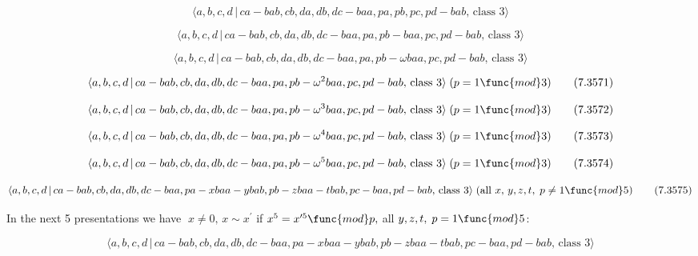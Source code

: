 \documentclass[10pt]{article}
\begin{document}
\begin{equation}
\langle a,b,c,d\,|\,ca-bab,cb,da,db,dc-baa,pa,pb,pc,pd-bab,\,\text{class }%
3\rangle  \tag{7.3568}
\end{equation}

\begin{equation}
\langle a,b,c,d\,|\,ca-bab,cb,da,db,dc-baa,pa,pb-baa,pc,pd-bab,\,\text{class 
}3\rangle  \tag{7.3569}
\end{equation}

\begin{equation}
\langle a,b,c,d\,|\,ca-bab,cb,da,db,dc-baa,pa,pb-\omega baa,pc,pd-bab,\,%
\text{class }3\rangle  \tag{7.3570}
\end{equation}

\begin{equation}
\langle a,b,c,d\,|\,ca-bab,cb,da,db,dc-baa,pa,pb-\omega ^{2}baa,pc,pd-bab,\,%
\text{class }3\rangle \;(p=1\func{mod}3)  \tag{7.3571}
\end{equation}

\begin{equation}
\langle a,b,c,d\,|\,ca-bab,cb,da,db,dc-baa,pa,pb-\omega ^{3}baa,pc,pd-bab,\,%
\text{class }3\rangle \;(p=1\func{mod}3)  \tag{7.3572}
\end{equation}

\begin{equation}
\langle a,b,c,d\,|\,ca-bab,cb,da,db,dc-baa,pa,pb-\omega ^{4}baa,pc,pd-bab,\,%
\text{class }3\rangle \;(p=1\func{mod}3)  \tag{7.3573}
\end{equation}

\begin{equation}
\langle a,b,c,d\,|\,ca-bab,cb,da,db,dc-baa,pa,pb-\omega ^{5}baa,pc,pd-bab,\,%
\text{class }3\rangle \;(p=1\func{mod}3)  \tag{7.3574}
\end{equation}

\begin{equation}
\langle
a,b,c,d\,|\,ca-bab,cb,da,db,dc-baa,pa-xbaa-ybab,pb-zbaa-tbab,pc-baa,pd-bab,\,%
\text{class }3\rangle \;(\text{all }x,\,y,z,t,\;p\neq 1\func{mod}5) 
\tag{7.3575}
\end{equation}

In the next 5 presentations we have $\;x\neq 0,\,x\sim x^{\prime }$ if $%
x^{5}=x^{\prime 5}\func{mod}p,$ all $y,z,t,\;p=1\func{mod}5$:

\begin{equation}
\langle
a,b,c,d\,|\,ca-bab,cb,da,db,dc-baa,pa-xbaa-ybab,pb-zbaa-tbab,pc-baa,pd-bab,\,%
\text{class }3\rangle  \tag{7.3576}
\end{equation}
\end{document}
